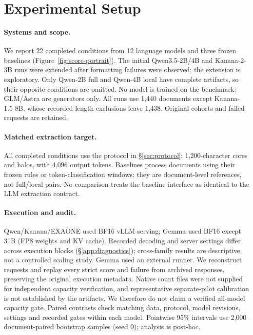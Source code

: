 \section{Experimental Setup}
\label{sec:setup}

\paragraph{Systems and scope.}
We report 22 completed conditions from 12 language models and three frozen baselines (Figure~\ref{fig:score-portrait}). The initial Qwen3.5-2B/4B and Kanana-2-3B runs were extended after formatting failures were observed; the extension is exploratory. Only Qwen-2B full and Qwen-4B local have complete artifacts, so their opposite conditions are omitted. No model is trained on the benchmark; GLM/Astra are generators only. All runs use 1,440 documents except Kanana-1.5-8B, whose recorded length exclusions leave 1,438. Original cohorts and failed requests are retained.

\paragraph{Matched extraction target.}
All completed conditions use the protocol in \S\ref{sec:protocol}: 1,200-character cores and halos, with 4,096 output tokens. Baselines process documents using their frozen rules or token-classification windows; they are document-level references, not full/local pairs. No comparison treats the baseline interface as identical to the LLM extraction contract.

\paragraph{Execution and audit.}
Qwen/Kanana/EXAONE used BF16 vLLM serving; Gemma used BF16 except 31B (FP8 weights and KV cache). Recorded decoding and server settings differ across execution blocks (\S\ref{app:diagnostics}); cross-family results are descriptive, not a controlled scaling study. Gemma used an external runner. We reconstruct requests and replay every strict score and failure from archived responses, preserving the original execution metadata. Native count files were not supplied for independent capacity verification, and representative separate-pilot calibration is not established by the artifacts. We therefore do not claim a verified all-model capacity gate. Paired contrasts check matching data, protocol, model revisions, settings and recorded gates within each model. Pointwise 95\% intervals use 2,000 document-paired bootstrap samples (seed 0); analysis is post-hoc.
